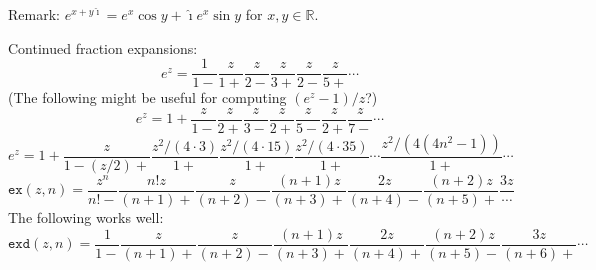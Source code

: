 \documentclass[10pt,dvipdfmx,letterpaper,twoside]{article}
\newcommand{\F}[1]{{\mathtt{#1}}}
\newcommand{\RR}{{\mathbb{R}}}
\newcommand{\ii}{{\hat{\imath}}}
\begin{document}
Remark: $e^{x+y\ii} = e^x\cos y + \ii e^x\sin y$ for $x,y\in\RR$.

Continued fraction expansions:
\[ e^z = \frac{1}{1-{}} \frac{z}{1+{}} \frac{z}{2-{}} \frac{z}{3+{}} \frac{z}{2-{}} \frac{z}{5+{}} \cdots\]
(The following might be useful for computing $(e^z-1)/z$?)
\[ e^z = 1+\frac{z}{1-} \frac{z}{2+} \frac{z}{3-} \frac{z}{2+} \frac{z}{5-} \frac{z}{2+} \frac{z}{7-} \cdots \]
\[ e^z = 1+\frac{z}{1-(z/2)+} \frac{z^2/(4\cdot3)}{1+} \frac{z^2/(4\cdot15)}{1+} \frac{z^2/(4\cdot35)}{1+} \cdots \frac{z^2/(4(4n^2-1))}{1+} \cdots \]
\[ \F{ex}(z,n) = \frac{z^n}{n!-{}} \frac{n! z}{(n+1)+{}} \frac{z}{(n+2)-{}} \frac{(n+1)z}{(n+3)+{}} \frac{2z}{(n+4)-{}} \frac{(n+2)z}{(n+5)+{}} \frac{3z}{\cdots} \]
The following works well:
\[ \F{exd}(z,n) = \frac{1}{1-} \frac{z}{(n+1)+} \frac{z}{(n+2)-} \frac{(n+1)z}{(n+3)+} \frac{2z}{(n+4)+} \frac{(n+2)z}{(n+5)-} \frac{3z}{(n+6)+} \cdots\]
\end{document}
